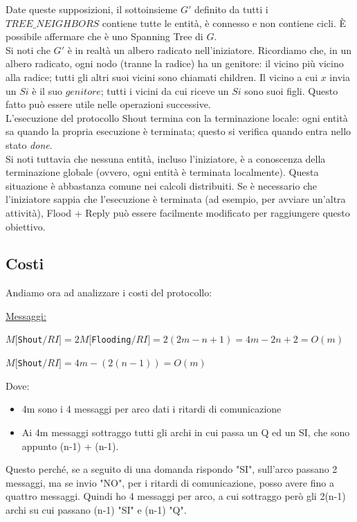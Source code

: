 Date queste supposizioni, il sottoinsieme $G'$ definito da tutti i
$TREE\_NEIGHBORS$ contiene tutte le entità, è connesso e non contiene cicli. È
possibile affermare che è uno Spanning Tree di $G$.\\
Si noti che $G'$ è in realtà un albero radicato nell'iniziatore. Ricordiamo che, in
un albero radicato, ogni nodo (tranne la radice) ha un genitore: il vicino più
vicino alla radice; tutti gli altri suoi vicini sono chiamati children. Il
vicino a cui $x$ invia un $Si$ è il suo $genitore$; tutti i vicini da cui riceve
un $Si$ sono suoi figli. Questo fatto può essere utile nelle operazioni
successive.\\
L'esecuzione del protocollo Shout termina con la terminazione locale: ogni
entità sa quando la propria esecuzione è terminata; questo si verifica quando
entra nello stato \textit{done}.\\
Si noti tuttavia che nessuna entità, incluso l'iniziatore, è a conoscenza della
terminazione globale (ovvero, ogni entità è terminata localmente). Questa
situazione è abbastanza comune nei calcoli distribuiti. Se è necessario che
l'iniziatore sappia che l'esecuzione è terminata (ad esempio, per avviare
un'altra attività), Flood + Reply può essere facilmente modificato per
raggiungere questo obiettivo.

\subsection{Costi}
Andiamo ora ad analizzare i costi del protocollo:

\underline{Messaggi:}
\begin{center}
    $M[$\texttt{Shout}$/RI] = 2 M[$\texttt{Flooding}$/RI] = 2(2m-n+1) = 4m - 2n +
        2 = O(m)$
\end{center}
\begin{center}
    $M[$\texttt{Shout}$/RI] = 4m - (2(n-1)) = O(m)$
\end{center}
Dove:
\begin{itemize}
    \item 4m sono i 4 messaggi per arco dati i ritardi di comunicazione
    \item Ai 4m messaggi sottraggo tutti gli archi in cui passa un Q ed un SI, che
          sono appunto (n-1) + (n-1).
\end{itemize}

Questo perché, se a seguito di una domanda rispondo "SI", sull'arco passano 2
messaggi, ma se invio "NO", per i ritardi di comunicazione, posso avere fino a
quattro messaggi. Quindi ho 4 messaggi per arco, a cui sottraggo però gli 2(n-1)
archi su cui passano (n-1) "SI" e (n-1) "Q".


